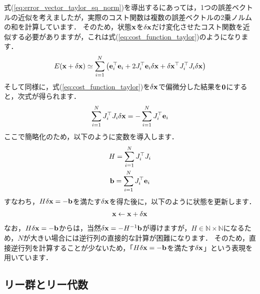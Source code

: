 式(\ref{eq:error_vector_taylor_sq_norm})を導出するにあっては，1つの誤差ベクトルの近似を考えましたが，実際のコスト関数は複数の誤差ベクトルの2乗ノルムの和を計算しています．
そのため，状態${\bf x}$を$\delta {\bf x}$だけ変化させたコスト関数を近似する必要がありますが，これは式(\ref{eq:cost_function_taylor})のようになります．
%
\begin{align}
  E( {\bf x} + \delta {\bf x} ) \simeq \sum_{i=1}^{N} \left( {\bf e}_{i}^{\top} {\bf e}_{i} + 2 J_{i}^{\top} {\bf e}_{i} \delta {\bf x} + \delta {\bf x}^{\top} J_{i}^{\top} J_{i} \delta {\bf x} \right)
  \label{eq:cost_function_taylor}
\end{align}
%
そして同様に，式(\ref{eq:cost_function_taylor})を$\delta {\bf x}$で偏微分した結果を${\bf 0}$にすると，次式が得られます．
%
\begin{align}
  \sum_{i=1}^{N} J_{i}^{\top} J_{i} \delta {\bf x} = -\sum_{i=1}^{N} J_{i}^{\top} {\bf e}_{i}
\end{align}
%
ここで簡略化のため，以下のように変数を導入します．
%
\begin{align}
  \begin{gathered}
    H = \sum_{i=1}^{N} J_{i}^{\top} J_{i} \\
    {\bf b} = \sum_{i=1}^{N} J_{i}^{\top} {\bf e}_{i}
  \end{gathered}
\end{align}
%
すなわち，$H \delta {\bf x} = -{\bf b}$を満たす$\delta {\bf x}$を得た後に，以下のように状態を更新します．
%
\begin{align}
  {\bf x} \leftarrow {\bf x} + \delta {\bf x}
  \label{eq:gauss_newton_update_vector}
\end{align}
%
なお，$H \delta {\bf x} = -{\bf b}$からは，当然$\delta {\bf x} = -H^{-1} {\bf b}$が導けますが，$H \in \mathbb{N \times N}$になるため，$N$が大きい場合には逆行列の直接的な計算が困難になります．
そのため，直接逆行列を計算することが少ないため，「$H \delta {\bf x} = -{\bf b}$を満たす$\delta {\bf x}$」という表現を用いています．





\subsection{リー群とリー代数}

